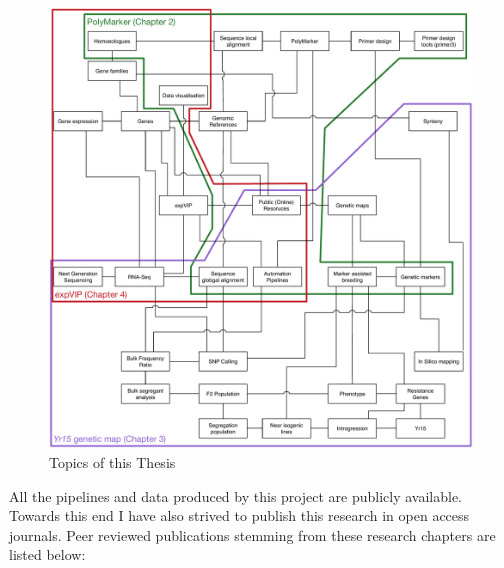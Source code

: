 \pagebreak
\begin{figure}[h!]
\centering
\includegraphics[width=1\textwidth]{Introduction/RicardoThesisTopics.pdf}
\caption{Topics of this Thesis}
\label{fig:intr:topics}
\end{figure}

\pagebreak
All the pipelines and data produced by this project are publicly available. Towards this end I have also strived to publish this research in open access journals. Peer reviewed publications stemming from these research chapters are listed below: 

